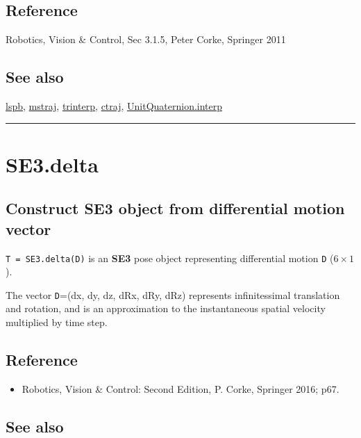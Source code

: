 \subsection*{Reference}


Robotics, Vision \& Control, Sec 3.1.5,
Peter Corke, Springer 2011


\subsection*{See also}


\hyperlink{lspb}{\color{blue} lspb}, \hyperlink{mstraj}{\color{blue} mstraj}, \hyperlink{trinterp}{\color{blue} trinterp}, \hyperlink{ctraj}{\color{blue} ctraj}, \hyperlink{UnitQuaternion.interp}{\color{blue} UnitQuaternion.interp}

\vspace{1.5ex}\hrule

\hypertarget{SE3.delta}{\section*{SE3.delta}}
\subsection*{Construct SE3 object from differential motion vector}


\texttt{T = SE3.delta(D)} is an \textbf{\color{red} SE3} pose object representing differential
motion \texttt{D} ($6 \times 1$).



The vector \texttt{D}=(dx, dy, dz, dRx, dRy, dRz) represents infinitessimal translation
and rotation, and is an approximation to the instantaneous spatial velocity
multiplied by time step.


\subsection*{Reference}
\begin{itemize}
  \item Robotics, Vision \& Control: Second Edition, P. Corke, Springer 2016; p67.
\end{itemize}

\subsection*{See also}


